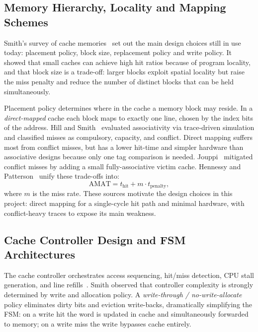 \documentclass[conference]{IEEEtran}
\renewcommand{\_}{\textunderscore\allowbreak{}}
\begin{document}
\subsection{Memory Hierarchy, Locality and Mapping Schemes}
\label{sec:litrev-a}

Smith's survey of cache memories~\cite{smith1982} set out the main design
choices still in use today: placement policy, block size, replacement
policy and write policy. It showed that small caches can achieve high hit
ratios because of program locality, and that block size is a trade-off:
larger blocks exploit spatial locality but raise the miss penalty and
reduce the number of distinct blocks that can be held simultaneously.

Placement policy determines where in the cache a memory block may reside.
In a \emph{direct-mapped} cache each block maps to exactly one line,
chosen by the index bits of the address. Hill and
Smith~\cite{hill1989} evaluated associativity via trace-driven simulation
and classified misses as compulsory, capacity, and conflict. Direct
mapping suffers most from conflict misses, but has a lower hit-time and
simpler hardware than associative designs because only one tag comparison
is needed. Jouppi~\cite{jouppi1990} mitigated conflict misses by adding a
small fully-associative victim cache. Hennessy and
Patterson~\cite{hennessy2017,patterson2020} unify these trade-offs into:
\begin{equation}
  \mathrm{AMAT} = t_{\mathrm{hit}} + m \cdot t_{\mathrm{penalty}},
  \label{eq:amat-basic}
\end{equation}
where $m$ is the miss rate. These sources motivate the design choices in
this project: direct mapping for a single-cycle hit path and minimal
hardware, with conflict-heavy traces to expose its main weakness.

\subsection{Cache Controller Design and FSM Architectures}
\label{sec:litrev-b}

The cache controller orchestrates access sequencing, hit/miss detection,
CPU stall generation, and line refills~\cite{smith1982,hennessy2017}.
Smith observed that controller complexity is strongly determined by write
and allocation policy. A \emph{write-through / no-write-allocate}
policy eliminates dirty bits and eviction write-backs, dramatically
simplifying the FSM: on a write hit the word is updated in cache and
simultaneously forwarded to memory; on a write miss the write bypasses
cache entirely.
\end{document}
